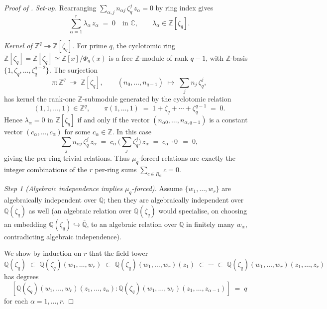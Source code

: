 \documentclass[aip,jmp,preprint,amsmath,amssymb,nofootinbib,floatfix]{revtex4-2}
\theoremstyle{plain}
\theoremstyle{definition}
\theoremstyle{remark}
\newcommand{\Zlc}{\mathbb{Z}[\zeta_q]}
\newcommand{\Qlc}{\mathbb{Q}(\zeta_q)}
\begin{document}
\begin{proof}[Proof of ]
\textit{Set-up.}
Rearranging $\sum_{\alpha, j} n_{\alpha j}\, \zeta_q^j\, z_\alpha = 0$
by ring index gives
\begin{equation}\label{eq:D2-rearranged}
   \sum_{\alpha = 1}^{r} \lambda_\alpha\, z_\alpha \;=\; 0
   \quad \text{in } \mathbb{C},
   \qquad \lambda_\alpha \in \Zlc.
\end{equation}

\smallskip
\textit{Kernel of $\mathbb{Z}^q \twoheadrightarrow \Zlc$.}
For prime $q$, the cyclotomic ring $\Zlc = \mathbb{Z}[\zeta_q] \simeq
\mathbb{Z}[x] / \Phi_q(x)$ is a free $\mathbb{Z}$-module of rank
$q - 1$, with $\mathbb{Z}$-basis $\{1, \zeta_q, \dots, \zeta_q^{q-2}\}$.
The surjection
\[
   \pi \colon \mathbb{Z}^{q} \;\twoheadrightarrow\; \Zlc,
   \qquad
   (n_0, \dots, n_{q-1}) \;\longmapsto\; \sum_j n_j\, \zeta_q^j,
\]
has kernel the rank-one $\mathbb{Z}$-submodule generated by the
cyclotomic relation
\[
   (1, 1, \dots, 1) \in \mathbb{Z}^q,
   \qquad
   \pi(1, \dots, 1) \;=\; 1 + \zeta_q + \cdots + \zeta_q^{q-1}
   \;=\; 0.
\]
Hence $\lambda_\alpha = 0$ in $\Zlc$ if and only if the vector
$(n_{\alpha 0}, \dots, n_{\alpha, q-1})$ is a constant vector
$(c_\alpha, \dots, c_\alpha)$ for some $c_\alpha \in \mathbb{Z}$.
In this case
\[
   \sum_{j} n_{\alpha j}\, \zeta_q^j\, z_\alpha
   \;=\;
   c_\alpha\, \Big(\sum_j \zeta_q^j\Big)\, z_\alpha
   \;=\;
   c_\alpha\, \cdot 0\,
   \;=\; 0,
\]
giving the per-ring trivial relations. Thus $\mu_q$-forced relations
are exactly the integer combinations of the $r$ per-ring sums
$\sum_{c \in R_\alpha} c = 0$.

\smallskip
\textit{Step 1 (Algebraic independence implies $\mu_q$-forced).}
Assume $\{w_1, \dots, w_r\}$ are algebraically independent over
$\mathbb{Q}$; then they are algebraically independent over
$\Qlc$ as well (an algebraic relation over $\Qlc$ would specialise,
on choosing an embedding $\Qlc \hookrightarrow \overline{\mathbb{Q}}$,
to an algebraic relation over $\mathbb{Q}$ in finitely many
$w_\alpha$, contradicting algebraic independence).

We show by induction on $r$ that the field tower
\begin{equation}\label{eq:D2-tower}
   \Qlc \;\subset\; \Qlc(w_1, \dots, w_r)
   \;\subset\; \Qlc(w_1, \dots, w_r)(z_1)
   \;\subset\; \cdots
   \;\subset\; \Qlc(w_1, \dots, w_r)(z_1, \dots, z_r)
\end{equation}
has degrees
\[
   [\Qlc(w_1, \dots, w_r)(z_1, \dots, z_\alpha) :
   \Qlc(w_1, \dots, w_r)(z_1, \dots, z_{\alpha - 1})] \;=\; q
\]
for each $\alpha = 1, \dots, r$.


\end{proof}
\end{document}
